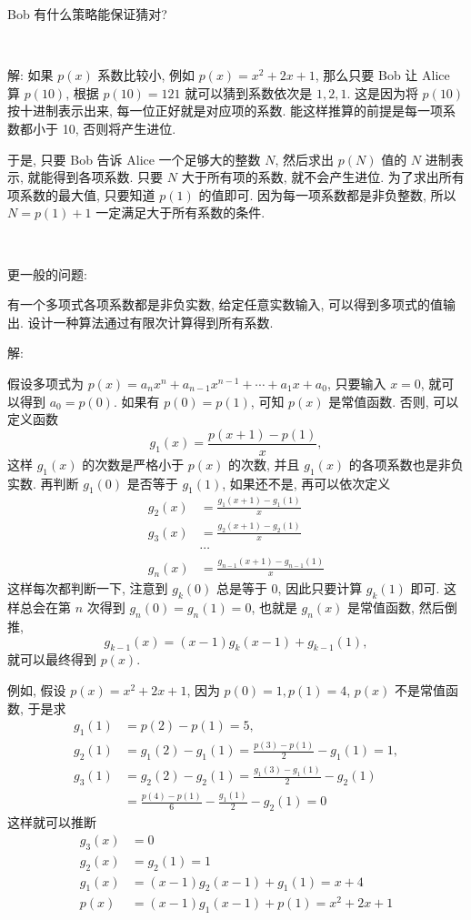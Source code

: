 Bob 有什么策略能保证猜对?

~

解: 如果 $p(x)$ 系数比较小, 例如 $p(x) = x^2 + 2x + 1$, 那么只要 Bob 让 Alice 算 $p(10)$, 根据 $p(10) = 121$ 就可以猜到系数依次是 $1,2,1$. 这是因为将 $p(10)$ 按十进制表示出来, 每一位正好就是对应项的系数. 能这样推算的前提是每一项系数都小于 10, 否则将产生进位. 

于是, 只要 Bob 告诉 Alice 一个足够大的整数 $N$, 然后求出 $p(N)$ 值的 $N$ 进制表示, 就能得到各项系数. 只要 $N$ 大于所有项的系数, 就不会产生进位. 为了求出所有项系数的最大值, 只要知道 $p(1)$ 的值即可. 因为每一项系数都是非负整数, 所以 $N = p(1) + 1$ 一定满足大于所有系数的条件.

~

\noindent 更一般的问题:

有一个多项式各项系数都是非负实数, 给定任意实数输入, 可以得到多项式的值输出. 设计一种算法通过有限次计算得到所有系数.

\noindent 解:

假设多项式为 $p(x) = a_nx^n + a_{n-1}x^{n-1} + \cdots + a_1x + a_0$, 只要输入 $x = 0$, 就可以得到 $a_0 = p(0)$. 如果有 $p(0) = p(1)$, 可知 $p(x)$ 是常值函数. 否则, 可以定义函数 
$$g_1(x) = \frac{p(x+1) - p(1)}{x} ,$$ 
这样 $g_1(x)$ 的次数是严格小于 $p(x)$ 的次数, 并且 $g_1(x)$ 的各项系数也是非负实数. 再判断 $g_1(0)$ 是否等于 $g_1(1)$, 如果还不是, 再可以依次定义
\begin{align*}
g_2(x) &= \frac{g_1(x+1) - g_1(1)}{x} \\
g_3(x) &= \frac{g_2(x+1) - g_2(1)}{x} \\
& \cdots \\
g_n(x) &= \frac{g_{n-1}(x+1) - g_{n-1}(1)}{x} 
\end{align*}
这样每次都判断一下, 注意到 $g_k(0)$ 总是等于 $0$, 因此只要计算 $g_k(1)$ 即可. 这样总会在第 $n$ 次得到 $g_n(0) = g_n(1) = 0$, 也就是 $g_n(x)$ 是常值函数, 然后倒推, 
\[
g_{k-1}(x) = (x-1)g_k(x-1) + g_{k-1}(1) ,
\]
就可以最终得到 $p(x)$. 

例如, 假设 $p(x)=x^2+2x+1$, 因为 $p(0)=1, p(1)=4$, $p(x)$ 不是常值函数, 于是求 
\begin{align*}
g_1(1) &= p(2)-p(1) = 5, \\
g_2(1) &= g_1(2)-g_1(1) = \frac{p(3) - p(1)}{2} - g_1(1) = 1, \\
g_3(1) &= g_2(2)-g_2(1) = \frac{g_1(3) - g_1(1)}{2} - g_2(1) \\
&= \frac{p(4) - p(1)}{6} - \frac{g_1(1)}{2} - g_2(1) = 0
\end{align*}
这样就可以推断 
\begin{align*}
g_3(x) &= 0\\ 
g_2(x) &= g_2(1) = 1 \\
g_1(x) &= (x-1)g_2(x-1) + g_1(1) = x + 4\\
p(x) &= (x-1)g_1(x-1) + p(1) = x^2 + 2x + 1
\end{align*}


